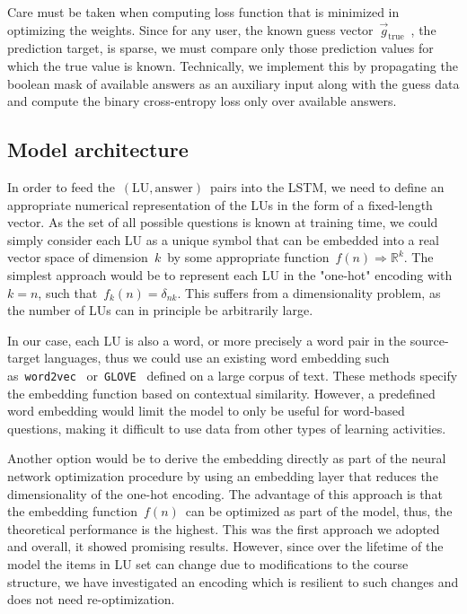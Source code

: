 Care must be taken when computing loss function that is minimized in optimizing the weights. Since for any user, the known guess vector~$\vec{g}_\mathrm{true}$~, the prediction target, is sparse, we must compare only those prediction values for which the true value is known. Technically, we implement this by propagating the boolean mask of available answers as an auxiliary input along with the guess data and compute the binary cross-entropy loss only over available answers.

\subsection{Model architecture}
\label{sec:nlp_model_architecture}
In order to feed the~$(\mathrm{LU}, \mathrm{answer})$~pairs into the LSTM, we need to define an appropriate numerical representation of the LUs in the form of a fixed-length vector. As the set of all possible questions is known at training time, we could simply consider each LU as a unique symbol that can be embedded into a real vector space of dimension~$k$~by some appropriate function~$f(n) \Rightarrow \mathbb{R}^k$. The simplest approach would be to represent each LU in the "one-hot" encoding with~$k=n$, such that~$f_k(n) = \delta_{nk}$. This suffers from a dimensionality problem, as the number of LUs can in principle be arbitrarily large.

In our case, each LU is also a word, or more precisely a word pair in the source-target languages, thus we could use an existing word embedding such
as~\texttt{word2vec}~\cite{mikolov2013efficient} or~\texttt{GLOVE}~\cite{pennington2014glove} defined on a large corpus of text. These methods specify the embedding function based on contextual similarity. However, a predefined word embedding would limit the model to only be useful for word-based questions, making it difficult to use data from other types of learning activities.

Another option would be to derive the embedding directly as part of the neural network optimization procedure by using an embedding layer that reduces the dimensionality of the one-hot encoding. The advantage of this approach is that the embedding function~$f(n)$~can be optimized as part of the model, thus, the theoretical performance is the highest. This was the first approach we adopted and overall, it showed promising results. However, since over the lifetime of the model the items in LU set can change due to modifications to the course structure, we have investigated an encoding which is resilient to such changes and does not need re-optimization.

